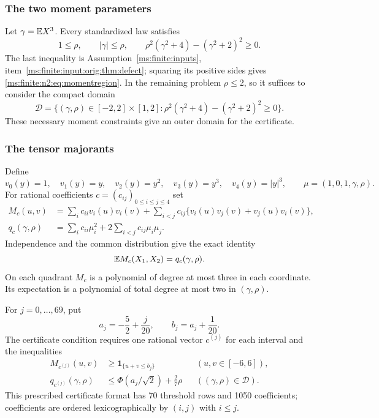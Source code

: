 \subsubsection{The two moment parameters}
Let $\gamma=\mathbb E X^3$. Every standardized law satisfies
\begin{equation}\label{ms:finite:n2:eq:momentregion}
 1\le\rho,\qquad |\gamma|\le\rho,\qquad
 \rho^2(\gamma^2+4)-(\gamma^2+2)^2\ge0.
\end{equation}
The last inequality is Assumption~\ref{ms:finite:inputs}, item~\ref{ms:finite:input:orig:thm:defect}; squaring its positive
sides gives \eqref{ms:finite:n2:eq:momentregion}. In the remaining problem $\rho\le2$,
so it suffices to consider the compact domain
\begin{equation}\label{ms:finite:n2:eq:D}
 \mathcal D=\{(\gamma,\rho)\in[-2,2]\times[1,2]:
 \rho^2(\gamma^2+4)-(\gamma^2+2)^2\ge0\}.
\end{equation}
These necessary moment constraints give an outer domain for the certificate.

\subsubsection{The tensor majorants}
Define
\[
 v_0(y)=1,\quad v_1(y)=y,\quad v_2(y)=y^2,
 \quad v_3(y)=y^3,\quad v_4(y)=|y|^3,
 \qquad \mu=(1,0,1,\gamma,\rho).
\]
For rational coefficients $c=(c_{ij})_{0\le i\le j\le4}$ set
\begin{align}
 M_c(u,v)&=\sum_i c_{ii}v_i(u)v_i(v)
 +\sum_{i<j}c_{ij}\{v_i(u)v_j(v)+v_j(u)v_i(v)\},\label{ms:finite:n2:eq:tensor}\\
 q_c(\gamma,\rho)&=\sum_i c_{ii}\mu_i^2
                 +2\sum_{i<j}c_{ij}\mu_i\mu_j.\label{ms:finite:n2:eq:expect}
\end{align}
Independence and the common distribution give the exact identity
\begin{equation}\label{ms:finite:n2:eq:factor}
                      \mathbb E M_c(X_1,X_2)=q_c(\gamma,\rho).
\end{equation}
On each quadrant $M_c$ is a polynomial of degree at most three in each
coordinate. Its expectation is a polynomial of total degree at most two
in $(\gamma,\rho)$.

For $j=0,\ldots,69$, put
\[
 a_j=-\frac52+\frac j{20},\qquad b_j=a_j+\frac1{20}.
\]
The certificate condition requires one rational vector $c^{(j)}$ for each interval and the inequalities
\begin{align}
 M_{c^{(j)}}(u,v)&\ge\mathbf1_{\{u+v\le b_j\}}
                 &&(u,v\in[-6,6]),\label{ms:finite:n2:eq:C1}\\
 q_{c^{(j)}}(\gamma,\rho)&\le\Phi(a_j/\sqrt2)+\frac27\rho
                 &&((\gamma,\rho)\in\mathcal D).\label{ms:finite:n2:eq:C2}
\end{align}
This prescribed certificate format has 70 threshold rows and 1050 coefficients;
coefficients are ordered lexicographically by $(i,j)$ with $i\le j$.

